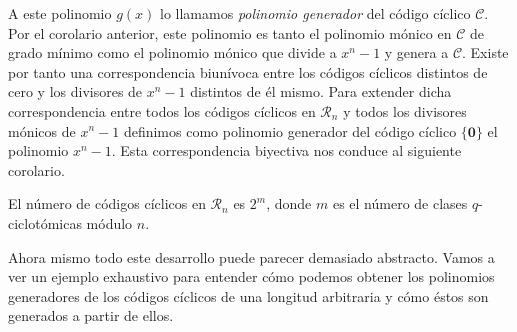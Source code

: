 A este polinomio \(g(x)\) lo llamamos \textit{polinomio generador} del código cíclico \(\mathcal C\).
Por el corolario anterior, este polinomio es tanto el polinomio mónico en \(\mathcal C\) de grado mínimo como el polinomio mónico que divide a \(x^n - 1\) y genera a \(\mathcal C\).
Existe por tanto una correspondencia biunívoca entre los códigos cíclicos distintos de cero y los divisores de \(x^n - 1\) distintos de él mismo.
Para extender dicha correspondencia entre todos los códigos cíclicos en \(\mathcal R_n\) y todos los divisores mónicos de \(x^n - 1\) definimos como polinomio generador del código cíclico \(\{\mathbf 0\}\) el polinomio \(x^n - 1\). 
Esta correspondencia biyectiva nos conduce al siguiente corolario.

\begin{corollary}
  El número de códigos cíclicos en \(\mathcal R_n\) es \(2^m\), donde \(m\) es el número de clases \(q\)-ciclotómicas módulo \(n\).
\end{corollary}

Ahora mismo todo este desarrollo puede parecer demasiado abstracto.
Vamos a ver un ejemplo exhaustivo para entender cómo podemos obtener los polinomios generadores de los códigos cíclicos de una longitud arbitraria y cómo éstos son generados a partir de ellos.

